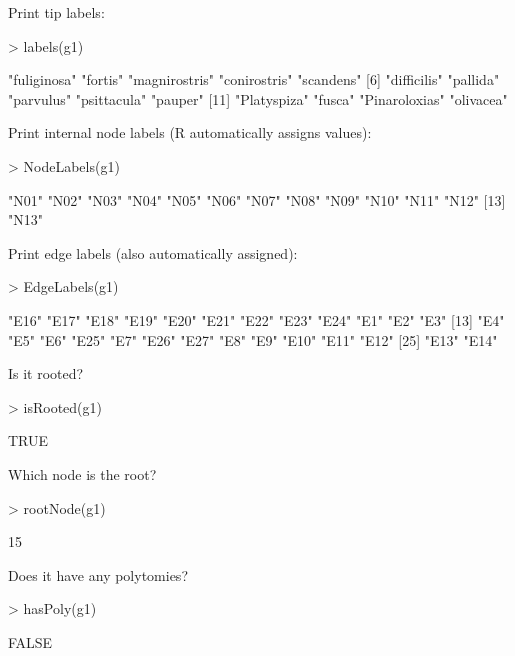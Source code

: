 \documentclass{article}
\begin{document}
Print tip labels:
\begin{Schunk}
\begin{Sinput}
> labels(g1)
\end{Sinput}
\begin{Soutput}
 [1] "fuliginosa"   "fortis"       "magnirostris" "conirostris"  "scandens"    
 [6] "difficilis"   "pallida"      "parvulus"     "psittacula"   "pauper"      
[11] "Platyspiza"   "fusca"        "Pinaroloxias" "olivacea"    
\end{Soutput}
\end{Schunk}

Print internal node labels (R automatically assigns values):
\begin{Schunk}
\begin{Sinput}
> NodeLabels(g1)
\end{Sinput}
\begin{Soutput}
 [1] "N01" "N02" "N03" "N04" "N05" "N06" "N07" "N08" "N09" "N10" "N11" "N12"
[13] "N13"
\end{Soutput}
\end{Schunk}

Print edge labels (also automatically assigned):
\begin{Schunk}
\begin{Sinput}
> EdgeLabels(g1)
\end{Sinput}
\begin{Soutput}
 [1] "E16" "E17" "E18" "E19" "E20" "E21" "E22" "E23" "E24" "E1"  "E2"  "E3" 
[13] "E4"  "E5"  "E6"  "E25" "E7"  "E26" "E27" "E8"  "E9"  "E10" "E11" "E12"
[25] "E13" "E14"
\end{Soutput}
\end{Schunk}

Is it rooted?
\begin{Schunk}
\begin{Sinput}
> isRooted(g1)
\end{Sinput}
\begin{Soutput}
[1] TRUE
\end{Soutput}
\end{Schunk}

Which node is the root?
\begin{Schunk}
\begin{Sinput}
> rootNode(g1)
\end{Sinput}
\begin{Soutput}
[1] 15
\end{Soutput}
\end{Schunk}

Does it have any polytomies?
\begin{Schunk}
\begin{Sinput}
> hasPoly(g1)
\end{Sinput}
\begin{Soutput}
[1] FALSE
\end{Soutput}
\end{Schunk}
\end{document}
